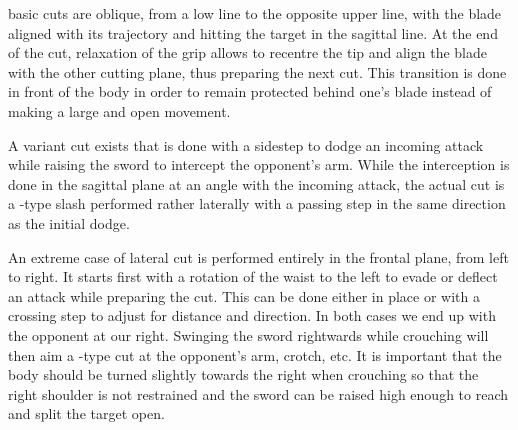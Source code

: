 \Liao{} basic cuts are oblique, from a low line to the opposite upper line, with the blade aligned with its trajectory and hitting the target in the sagittal line. At the end of the cut, relaxation of the grip allows to recentre the tip and align the blade with the other cutting plane, thus preparing the next \Liao{} cut. This transition is done in front of the body in order to remain protected behind one's blade instead of making a large and open movement. 

A variant \Liao{} cut exists that is done with a sidestep to dodge an incoming attack while raising the sword to intercept the opponent's arm. While the interception is done in the sagittal plane at an angle with the incoming attack, the actual cut is a \Hua{}-type slash performed rather laterally with a passing step in the same direction as the initial dodge.

An extreme case of lateral \Liao{} cut is performed entirely in the frontal plane, from left to right. It starts first with a rotation of the waist to the left to evade or deflect an attack while preparing the cut. This can be done either in place or with a crossing step to adjust for distance and direction. In both cases we end up with the opponent at our right. Swinging the sword rightwards while crouching will then aim a \Pi{}-type \Liao{} cut at the opponent's arm, crotch, etc. It is important that the body should be turned slightly towards the right  when crouching so that the right shoulder is not restrained and the sword can be raised high enough to reach and split the target open. 




